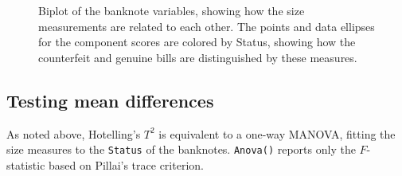 \documentclass[
  letterpaper,
  10pt,
  krantz2]{krantz}
\begin{document}
\begin{figure}[H]


\caption{\label{fig-banknote-biplot}Biplot of the banknote variables,
showing how the size measurements are related to each other. The points
and data ellipses for the component scores are colored by Status,
showing how the counterfeit and genuine bills are distinguished by these
measures.}

\end{figure}%

\subsection{Testing mean differences}\label{testing-mean-differences}

As noted above, Hotelling's \(T^2\) is equivalent to a one-way MANOVA,
fitting the size measures to the \texttt{Status} of the banknotes.
\texttt{Anova()} reports only the \(F\)-statistic based on Pillai's
trace criterion.
\end{document}
